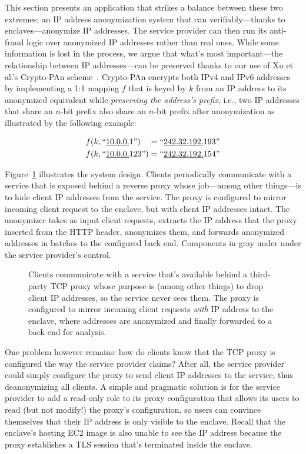 This section presents an application that strikes a balance between these two extremes; an IP address anonymization system that can verifiably---thanks to enclaves---anonymize IP addresses.  The service provider can then run its anti-fraud logic over anonymized IP addresses rather than real ones.  While some information is lost in the process, we argue that what's most important---the relationship between IP addresses---can be preserved thanks to our use of Xu et al.'s Crypto-PAn scheme~\cite{Xu01a}.  Crypto-PAn encrypts both IPv4 and IPv6 addresses by implementing a 1:1 mapping $f$ that is keyed by $k$ from an IP address to its anonymized equivalent while \emph{preserving the address's prefix}, i.e., two IP addresses that share an $n$-bit prefix also share an $n$-bit prefix after anonymization as illustrated by the following example:

\begin{align}
f(k, \textrm{``\underline{10.0.0.}1''})\phantom{23} = \textrm{``\underline{242.32.192.}193''} \\
f(k, \textrm{``\underline{10.0.0.}123''}) = \textrm{``\underline{242.32.192.}154''}
\end{align}

Figure~\ref{fig:address-anonymizer} illustrates the system design.  Clients periodically communicate with a service that is exposed behind a reverse proxy whose job---among other things---is to hide client IP addresses from the service.  The proxy is configured to mirror incoming client request to the enclave, but with client IP addresses intact.  The anonymizer takes as input client requests, extracts the IP address that the proxy inserted from the HTTP header, anonymizes them, and forwards anonymized addresses in batches to the configured back end.  Components in gray under under the service provider's control.

\begin{figure}[t]
\centering

\caption{Clients communicate with a service that's available behind a third-party TCP proxy whose purpose is (among other things) to drop client IP addresses, so the service never sees them.  The proxy is configured to mirror incoming client requests \emph{with} IP address to the enclave, where addresses are anonymized and finally forwarded to a back end for analysis.}
\label{fig:address-anonymizer}
\end{figure}

One problem however remains: how do clients know that the TCP proxy is configured the way the service provider claims?  After all, the service provider could simply configure the proxy to send client IP addresses to the service, thus deanonymizing all clients.  A simple and pragmatic solution is for the service provider to add a read-only role to its proxy configuration that allows its users to read (but not modify!) the proxy's configuration, so users can convince themselves that their IP address is only visible to the enclave.  Recall that the enclave's hosting EC2 image is also unable to see the IP address because the proxy establishes a TLS session that's terminated inside the enclave.

